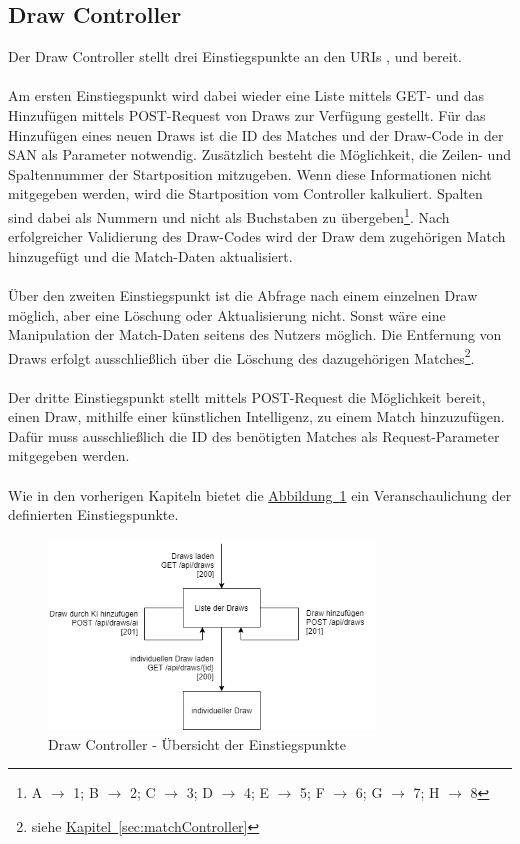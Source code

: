 \subsection{Draw Controller}\label{sec:drawController}
Der Draw Controller stellt drei Einstiegspunkte an den \glspl{URI} ,  und  bereit. \\
\\
Am ersten Einstiegspunkt wird dabei wieder eine Liste mittels GET- und das Hinzufügen mittels POST-Request von Draws zur Verfügung gestellt. Für das Hinzufügen eines neuen Draws ist die ID des Matches und der Draw-Code in der \gls{SAN} als Parameter notwendig. Zusätzlich besteht die Möglichkeit, die Zeilen- und Spaltennummer der Startposition mitzugeben. Wenn diese Informationen nicht mitgegeben werden, wird die Startposition vom Controller kalkuliert. Spalten sind dabei als Nummern und nicht als Buchstaben zu übergeben\footnote{A $\rightarrow$ 1; B $\rightarrow$ 2; C $\rightarrow$ 3; D $\rightarrow$ 4; E $\rightarrow$ 5; F $\rightarrow$ 6; G $\rightarrow$ 7; H $\rightarrow$ 8}. Nach erfolgreicher Validierung des Draw-Codes wird der Draw dem zugehörigen Match hinzugefügt und die Match-Daten aktualisiert.\\
\\
Über den zweiten Einstiegspunkt ist die Abfrage nach einem einzelnen Draw möglich, aber eine Löschung oder Aktualisierung nicht. Sonst wäre eine Manipulation der Match-Daten seitens des Nutzers möglich. Die Entfernung von Draws erfolgt ausschließlich über die Löschung des dazugehörigen Matches\footnote{siehe \hyperref[sec:matchController]{Kapitel~\ref{sec:matchController}}}.\\
\\
Der dritte Einstiegspunkt stellt mittels POST-Request die Möglichkeit bereit, einen Draw, mithilfe einer künstlichen Intelligenz, zu einem Match hinzuzufügen. Dafür muss ausschließlich die ID des benötigten Matches als Request-Parameter mitgegeben werden.\\
\\
Wie in den vorherigen Kapiteln bietet die \hyperref[fig:drawController]{Abbildung~\ref{fig:drawController}} ein Veranschaulichung der definierten Einstiegspunkte.\\
\begin{figure}[htb]
	\includegraphics[width=0.7735\textwidth]{images/draw-controller.png}
	\caption{Draw Controller - Übersicht der Einstiegspunkte}
	\label{fig:drawController}
\end{figure}

